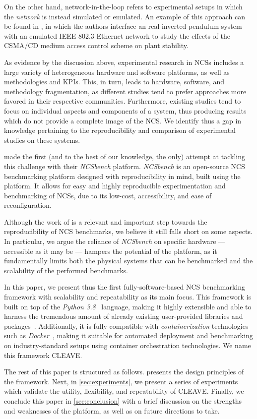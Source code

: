 On the other hand, network-in-the-loop refers to experimental setups in which the \emph{network} is instead simulated or emulated.
An example of this approach can be found in \textcite{Natale2004InvPendEthernet}, in which the authors interface an real inverted pendulum system with an emulated IEEE 802.3 Ethernet network to study the effects of the \ac{CSMA/CD} medium access control scheme on plant stability.

As evidence by the discussion above, experimental research in \acp{NCS} includes a large variety of heterogeneous hardware and software platforms, as well as methodologies and \acp{KPI}.
This, in turn, leads to hardware, software, and methodology fragmentation, as different studies tend to prefer approaches more favored in their respective communities.
Furthermore, existing studies tend to focus on individual aspects and components of a system, thus producing results which do not provide a complete image of the \ac{NCS}.
We identify thus a gap in knowledge pertaining to the reproducibility and comparison of experimental studies on these systems.

\textcite{Zoppi2020NCSBench} made the first (and to the best of our knowledge, the only) attempt at tackling this challenge with their \emph{NCSbench} platform.
\emph{NCSbench} is an open-source \ac{NCS} benchmarking platform designed with reproducibility in mind, built using the ~\cite{LEGOMindstormsEV3} platform.
It allows for easy and highly reproducible experimentation and benchmarking of \acp{NCS}, due to its low-cost, accessibility, and ease of reconfiguration.

Although the work of \textcite{Zoppi2020NCSBench} is a relevant and important step towards the reproducibility of \ac{NCS} benchmarks, we believe it still falls short on some aspects.
In particular, we argue the reliance of \emph{NCSbench} on specific hardware --- accessible as it may be --- hampers the potential of the platform, as it fundamentally limits both the physical systems that can be benchmarked and the scalability of the performed benchmarks.

In this paper, we present thus the first fully-software-based \ac{NCS} benchmarking framework with scalability and repeatability as its main focus.
This framework is built on top of the \emph{Python 3.8}~\cite{Python3.8} language, making it highly extensible and able to harness the tremendous amount of already existing user-provided libraries and packages~\cite{pypi}.
Additionally, it is fully compatible with \emph{containerization} technologies such as \emph{Docker}~\cite{merkel2014docker}, making it suitable for automated deployment and benchmarking on industry-standard setups using container orchestration technologies.
We name this framework \ac{CLEAVE}.

The rest of this paper is structured as follows.
 presents the design principles of the framework.
Next, in \cref{sec:experiments}, we present a series of experiments which validate the utility, flexibility, and repeatability of \ac{CLEAVE}.
Finally, we conclude this paper in \cref{sec:conclusion} with a brief discussion on the strengths and weaknesses of the platform, as well as on future directions to take.